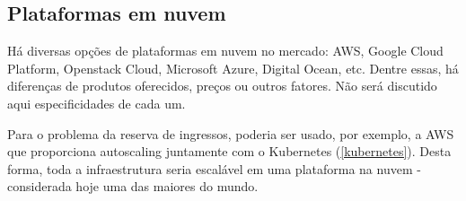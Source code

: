 
\subsection{Plataformas em nuvem}

Há diversas opções de plataformas em nuvem no mercado: AWS, Google Cloud Platform,
Openstack Cloud, Microsoft Azure, Digital Ocean, etc. Dentre essas, há diferenças
de produtos oferecidos, preços ou outros fatores. Não será discutido aqui
especificidades de cada um.

Para o problema da reserva de ingressos, poderia ser usado, por exemplo, a AWS
que proporciona autoscaling \cite{aws-autoscaling} juntamente com o
Kubernetes (\autoref{kubernetes}).
Desta forma, toda a infraestrutura seria escalável em uma plataforma na nuvem - 
considerada hoje uma das maiores do mundo.

%
%
%
%
%
%
%
%
%
%
%
%
%
%
%
%
%
%
%
%
